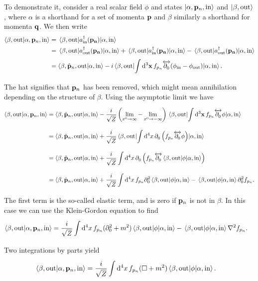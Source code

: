 To demonstrate it, consider a real scalar field $\phi$ and states $\ket{\alpha, \vb{p}_{n}, \text{in}}$ and $\ket{\beta, \text{out}}$, where $\alpha$ is a shorthand for a set of momenta $\vb{p}$ and $\beta$ similarly a shorthand for momenta $\vb{q}$. We then write
\begin{align*}
	\braket{\beta, \text{out}}{\alpha, \vb{p}_{n}, \text{in}} &= \mel{\beta, \text{out}}{a_{\text{in}}\ensuremath{^{\dagger}}(\vb{p_{n}})}{\alpha, \text{in}} \\
	&= \mel{\beta, \text{out}}{a_{\text{out}}\ensuremath{^{\dagger}}(\vb{p_{n}})}{\alpha, \text{in}} + \mel{\beta, \text{out}}{a_{\text{in}}\ensuremath{^{\dagger}}(\vb{p_{n}})}{\alpha, \text{in}} - \mel{\beta, \text{out}}{a_{\text{out}}\ensuremath{^{\dagger}}(\vb{p_{n}})}{\alpha, \text{in}} \\
	&= \braket{\beta, \hat{\vb{p}}_{n}, \text{out}}{\alpha, \text{in}} - i\mel{\beta, \text{out}}{\int\limits_{}^{}\dd[3]{\vb{x}}f_{p_{n}}\ensuremath{\overleftrightarrow{\partial^{}_{0}}}(\phi_{\text{in}} - \phi_{\text{out}})}{\alpha, \text{in}}.
\end{align*}
The hat signifies that $\vb{p}_{n}$ has been removed, which might mean annihilation depending on the structure of $\beta$. Using the asymptotic limit we have
\begin{align*}
	\braket{\beta, \text{out}}{\alpha, \vb{p}_{n}, \text{in}} &= \braket{\beta, \hat{\vb{p}}_{n}, \text{out}}{\alpha, \text{in}} - \frac{i}{\sqrt{Z}}\left(\lim\limits_{x^{0} \to \infty} - \lim\limits_{x^{0} \to -\infty}\right)\mel{\beta, \text{out}}{\int\limits_{}^{}\dd[3]{\vb{x}}f_{p_{n}}\ensuremath{\overleftrightarrow{\partial^{}_{0}}}\phi}{\alpha, \text{in}} \\
	&= \braket{\beta, \hat{\vb{p}}_{n}, \text{out}}{\alpha, \text{in}} + \frac{i}{\sqrt{Z}}\mel{\beta, \text{out}}{\int\limits_{}^{}\dd[4]{x}\ensuremath{\partial^{}_{0}}\left(f_{p_{n}}\ensuremath{\overleftrightarrow{\partial^{}_{0}}}\phi\right)}{\alpha, \text{in}} \\
	&= \braket{\beta, \hat{\vb{p}}_{n}, \text{out}}{\alpha, \text{in}} + \frac{i}{\sqrt{Z}}\int\limits_{}^{}\dd[4]{x}\partial^{}_{0}\left(f_{p_{n}}\overleftrightarrow{\partial^{}_{0}}\mel{\beta, \text{out}}{\phi}{\alpha, \text{in}}\right) \\
	&= \braket{\beta, \hat{\vb{p}}_{n}, \text{out}}{\alpha, \text{in}} + \frac{i}{\sqrt{Z}}\int\limits_{}^{}\dd[4]{x}f_{p_{n}}\partial^{2}_{0}\mel{\beta, \text{out}}{\phi}{\alpha, \text{in}} - \mel{\beta, \text{out}}{\phi}{\alpha, \text{in}}\partial^{2}_{0}f_{p_{n}}.
\end{align*}
The first term is the so-called elastic term, and is zero if $\vb{p}_{n}$ is not in $\beta$. In this case we can use the Klein-Gordon equation to find
\begin{align*}
	\braket{\beta, \text{out}}{\alpha, \vb{p}_{n}, \text{in}} &= \frac{i}{\sqrt{Z}}\integ[4]{}{}{x}{f_{p_{n}}(\del{2}{0} + m^{2})\mel{\beta, \text{out}}{\phi}{\alpha, \text{in}} - \mel{\beta, \text{out}}{\phi}{\alpha, \text{in}}\laplacian f_{p_{n}}}.
\end{align*}
Two integrations by parts yield
\begin{align*}
	\braket{\beta, \text{out}}{\alpha, \vb{p}_{n}, \text{in}} &= \frac{i}{\sqrt{Z}}\int\limits_{}^{}\dd[4]{x}f_{p_{n}}(\square + m^{2})\mel{\beta, \text{out}}{\phi}{\alpha, \text{in}}.
\end{align*}

